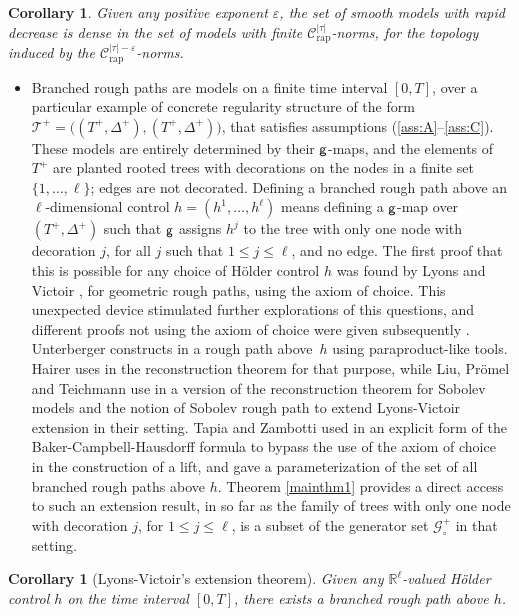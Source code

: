 \documentclass[10pt]{amsart}
\theoremstyle{plain}
\newtheorem{cor}[thm]{Corollary}
\theoremstyle{definition}
\newcommand{\rap}{\mathrm{rap}}
\let\epsilon\varepsilon
\newcommand{\bbR}{\mathbb{R}}
\newcommand{\mcC}{\mathcal{C}}
\newcommand{\mcG}{\mathcal{G}}
\begin{document}
\begin{cor} \label{CorDensity}
Given any positive exponent $\epsilon$, the set of smooth models with rapid decrease
is dense in the set of models with finite $\mcC_{\rap}^{|\tau|}$-norms, for the topology induced by the $\mcC_{\rap}^{|\tau|-\epsilon}$-norms.
\end{cor}

\begin{itemize}
\item
Branched rough paths are models on a finite time interval $[0,T]$, over a particular example of concrete regularity structure of the form $\mathscr{T}^+=\bigl((T^+,\Delta^+),(T^+,\Delta^+)\bigr)$, that satisfies assumptions (\ref{ass:A}--\ref{ass:C}). These models are entirely determined by their $\sf g$\nobreakdash-maps, and the elements of $T^+$ are planted rooted trees with decorations on the nodes in a finite set $\{1,\dots,\ell\}$; edges are not decorated. Defining a branched rough path above an $\ell$-dimensional control $h=(h^1,\dots,h^\ell)$ means defining a $\sf g$-map over $(T^+,\Delta^+)$ such that $\sf g$ assigns $h^j$ to the tree with only one node with decoration $j$, for all $j$ such that $1\leq j\leq \ell$, and no edge. The first proof that this is possible for any choice of Hölder control $h$ was found by Lyons and Victoir \cite{LyonsVictoir}, for geometric rough paths, using the axiom of choice. This unexpected device stimulated further explorations of this questions, and different proofs not using the axiom of choice were given subsequently \cite{Unterberger, Hai, TZ18, LPT18}. Unterberger constructs in \cite{Unterberger} a rough path above~$h$ using paraproduct-like tools. Hairer uses in \cite{Hai} the reconstruction theorem for that purpose, while Liu, Prömel and Teichmann use in \cite{LPT18} a version of the reconstruction theorem for Sobolev models and the notion of Sobolev rough path to extend Lyons-Victoir extension in their setting. Tapia and Zambotti used in \cite{TZ18} an explicit form of the Baker-Campbell-Hausdorff formula to bypass the use of the axiom of choice in the construction of a lift, and gave a parameterization of the set of all branched rough paths above $h$. Theorem \ref{mainthm1} provides a direct access to such an extension result, in so far as the family of trees with only one node with decoration $j$, for $1\leq j\leq\ell$, is a subset of the generator set $\mcG^+_\circ$ in that setting.
\end{itemize}

\begin{cor}[Lyons-Victoir's extension theorem] \label{CorLyonsVictoir}
Given any $\bbR^\ell$-valued Hölder control $h$ on the time interval $[0,T]$, there exists a branched rough path above $h$.
\end{cor}
\end{document}
